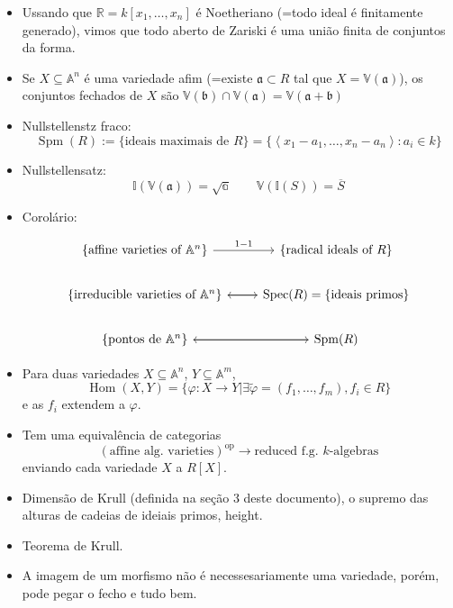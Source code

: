 \begin{itemize}
	\item Ussando que $\mathbb{R}=k[x_1,\ldots,x_n]$ \'e Noetheriano (=todo ideal \'e finitamente generado), vimos que todo aberto de Zariski \'e uma uni\~ao finita de conjuntos da forma.

	\item Se $X\subseteq \mathbb{A}^{n} $ \'e uma variedade afim (=existe $\mathfrak{a}\subset R$ tal que $X=\mathbb{V}(\mathfrak{a})$), os conjuntos fechados de $X$ s\~ao $\mathbb{V}(\mathfrak{b})\cap \mathbb{V}(\mathfrak{a})=\mathbb{V}(\mathfrak{a}+\mathfrak{b})$
	
	\item Nullstellenstz fraco:
		\[\operatorname{Spm }(R):=\{\text{ideais maximais de $R$} \} =\{\left<x_1-a_1,\ldots,x_n-a_n\right> :a_i\in k\}\]

	\item Nullstellensatz:
		\[\mathbb{I}(\mathbb{V}(\mathfrak{a}))=\sqrt{\mathbb{a}} \qquad \mathbb{V}(\mathbb{I}(S))=\overline{S}\]

	\item Corol\'ario:

		\[\begin{tikzcd}
			\{\text{affine varieties of $\mathbb{A}^{n} $} \} \arrow[r,"1-1"]&\{\text{radical ideals of $R$} \} \\
			\{\text{irreducible varieties of $\mathbb{A}^{n} $} \}\arrow[r]&\arrow[l]\operatorname{Spec}(R)=\{\text{ideais primos} \} \\
			\{\text{pontos de $\mathbb{A}^{n} $} \} \arrow[r]&\arrow[l]\operatorname{Spm}(R)
		\end{tikzcd}\]
	
	\item Para duas variedades $X\subseteq \mathbb{A}^n$, $Y\subseteq \mathbb{A}^m$,
		\[\operatorname{Hom}(X,Y)=\{\varphi:X\to Y|\exists \tilde{\varphi}=(f_1,\ldots,f_m), f_i\in R \}\]
		e as $f_i$ extendem a $\varphi$.

		 \item Tem uma equival\^encia de categorias
			 \[(\text{affine alg. varieties})^{\operatorname{op}}\to \text{reduced f.g. $k$-algebras}  \]
			 enviando cada variedade $X$ a $R[X]$.

	\item Dimens\~ao de Krull (definida na seç\~ao 3 deste documento), o supremo das alturas de cadeias de ideiais primos, height.

	\item Teorema de Krull.

	\item A imagem de um morfismo n\~ao \'e necessesariamente uma variedade, por\'em, pode pegar o fecho e tudo bem.

	
\end{itemize}

